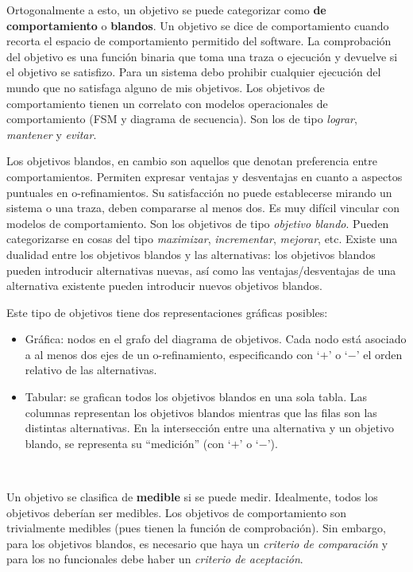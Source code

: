 \documentclass[]{article}
\begin{document}
Ortogonalmente a esto, un objetivo se puede categorizar como \textbf{de comportamiento} o \textbf{blandos}. Un objetivo se dice de comportamiento cuando recorta el espacio de comportamiento permitido del software. La comprobación del objetivo es una función binaria que toma una traza o ejecución y devuelve si el objetivo se satisfizo. Para un sistema debo prohibir cualquier ejecución del mundo que no satisfaga alguno de mis objetivos. Los objetivos de comportamiento tienen un correlato con modelos operacionales de comportamiento (FSM y diagrama de secuencia). Son los de tipo \textit{lograr}, \textit{mantener} y \textit{evitar}.

Los objetivos blandos, en cambio son aquellos que denotan preferencia entre comportamientos. Permiten expresar ventajas y desventajas en cuanto a aspectos puntuales en o-refinamientos. Su satisfacción no puede establecerse mirando un sistema o una traza, deben compararse al menos dos. Es muy difícil vincular con modelos de comportamiento. Son los objetivos de tipo \textit{objetivo blando}. Pueden categorizarse en cosas del tipo \textit{maximizar}, \textit{incrementar}, \textit{mejorar}, etc. Existe una dualidad entre los objetivos blandos y las alternativas: los objetivos blandos pueden introducir alternativas nuevas, así como las ventajas/desventajas de una alternativa existente pueden introducir nuevos objetivos blandos.

Este tipo de objetivos tiene dos representaciones gráficas posibles:
\begin{itemize}
	\item Gráfica: nodos en el grafo del diagrama de objetivos. Cada nodo está asociado a al menos dos ejes de un o-refinamiento, especificando con `$+$' o `$-$' el orden relativo de las alternativas.
	\item Tabular: se grafican todos los objetivos blandos en una sola tabla. Las columnas representan los objetivos blandos mientras que las filas son las distintas alternativas. En la intersección entre una alternativa y un objetivo blando, se representa su ``medición'' (con `$+$' o `$-$').
\end{itemize}~\newline

Un objetivo se clasifica de \textbf{medible} si se puede medir. Idealmente, todos los objetivos deberían ser medibles. Los objetivos de comportamiento son trivialmente medibles (pues tienen la función de comprobación). Sin embargo, para los objetivos blandos, es necesario que haya un \textit{criterio de comparación} y para los no funcionales debe haber un \textit{criterio de aceptación}.
\end{document}
